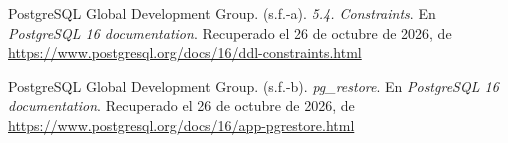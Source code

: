 \renewcommand{\refname}{Referencias}
{}
\begin{thebibliography}{}
PostgreSQL Global Development Group. (s.f.-a).
\textit{5.4. Constraints}. En \textit{PostgreSQL 16 documentation}.
Recuperado el 26 de octubre de 2026, de
\url{https://www.postgresql.org/docs/16/ddl-constraints.html}

PostgreSQL Global Development Group. (s.f.-b).
\textit{pg\_restore}. En \textit{PostgreSQL 16 documentation}.
Recuperado el 26 de octubre de 2026, de
\url{https://www.postgresql.org/docs/16/app-pgrestore.html}
\end{thebibliography}
